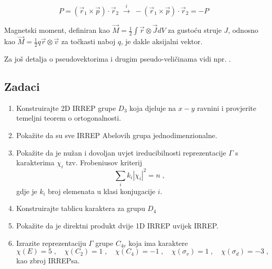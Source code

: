 \[
P = (\vec{r}_1 \times \vec{p}) \cdot \vec{r}_2  \; \stackrel{i}{\longrightarrow} \;
  - (\vec{r}_1 \times \vec{p}) \cdot \vec{r}_2 = - P
\]

Magnetski moment, definiran kao $\vec{M} = \frac{1}{2} \int \vec{r}
\otimes \vec{J} dV$ za gustoću struje $J$, odnosno kao
$\vec{M} = \frac{1}{2} q \vec{r} \otimes \vec{v}$ za točkasti
naboj $q$, je dakle aksijalni vektor.

Za još detalja o pseudovektorima i drugim pseudo-veličinama vidi
npr. \cite{Arfken95}.

\subsection*{Zadaci}

\begin{enumerate}[{3}.1]

\item Konstruirajte 2D IRREP grupe $D_3$ koja djeluje na $x-y$ ravnini
i provjerite temeljni teorem o ortogonalnosti.

\item Pokažite da su sve IRREP Abelovih grupa jednodimenzionalne.

\item Pokažite da je nužan i dovoljan uvjet ireducibilnosti reprezentacije
 $\Gamma$ s karakterima $\chi_i$ tzv. Frobeniusov kriterij
\begin{displaymath}
    \sum_i k_i |\chi_i|^2 = n  \;,
\end{displaymath}
gdje je $k_i$ broj elemenata u klasi konjugacije $i$.

\item Konstruirajte tablicu karaktera za grupu $D_4$

\item Pokažite da je direktni produkt dvije 1D IRREP uvijek IRREP.

\item Izrazite reprezentaciju $\Gamma$ grupe $C_{4v}$ koja ima
karaktere
\begin{displaymath}
  \chi(E)=5\;,\quad \chi(C_2)=1\;,\quad \chi(C_4)=-1\;,\quad
  \chi(\sigma_v)=1\;,\quad \chi(\sigma_d)=-3\;,
\end{displaymath}
kao zbroj IRREPsa.
\end{enumerate}

